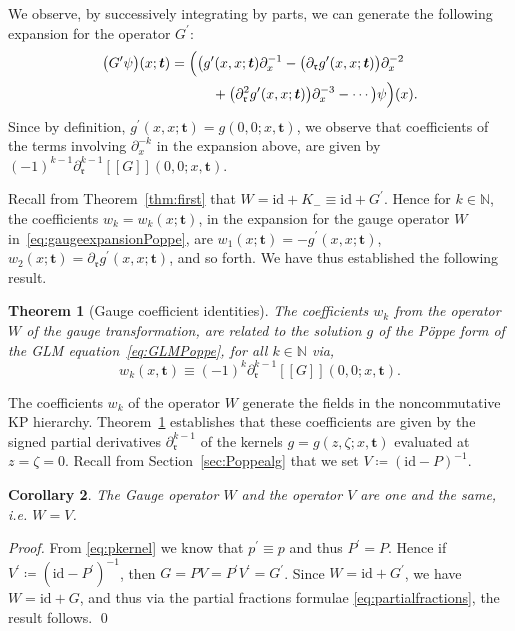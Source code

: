 \documentclass[5p,twocolumn]{elsarticle}
\newcommand*{\id}{{\mathrm{id}}}
\newcommand*{\pa}{{\partial}}
\newcommand*{\lb}{[\![}
\newcommand*{\rb}{]\!]}
\newcommand*{\tbf}{\boldsymbol{t}}
\newcommand*{\rl}{\mathfrak r}
\newtheorem{theorem}{Theorem}
\newtheorem{corollary}[theorem]{Corollary}
\begin{document}
We observe, by successively integrating by parts, we can generate the following expansion for the operator $G^\prime$:
\begin{align*}
  \bigl(G^\prime\psi\bigr)(x;\tbf)=&\;\Bigl(\bigl(g^\prime(x,x;\tbf)\pa_x^{-1}-\bigl(\pa_{\rl}g^\prime(x,x;\tbf)\bigr)\pa_x^{-2}\\
  &\;~~~~~+\bigl(\pa_{\rl}^2g^\prime(x,x;\tbf)\bigr)\pa_x^{-3}-\cdots\bigr)\psi\Bigr)(x).
\end{align*}
Since by definition, $g^\prime(x,x;\tbf)=g(0,0;x,\tbf)$, we observe that coefficients of the terms involving $\pa_x^{-k}$ in the expansion above,  
are given by $(-1)^{k-1}\pa^{k-1}_{\rl}\lb G\rb(0,0;x,\tbf)$.

Recall from Theorem~\ref{thm:first} that $W=\id+K_-\equiv\id+G^\prime$.
Hence for $k\in\mathbb N$, the coefficients $w_k=w_k(x;\tbf)$, in the expansion for the gauge operator $W$ in~\eqref{eq:gaugeexpansionPoppe},
are $w_1(x;\tbf)=-g^\prime(x,x;\tbf)$, $w_2(x;\tbf)=\pa_{\rl}g^\prime(x,x;\tbf)$, and so forth.
We have thus established the following result.
%
\begin{theorem}[Gauge coefficient identities]\label{thm:gaugecoeffsid}
  The coefficients $w_k$ from the operator $W$ of the gauge transformation, are related to the solution $g$ of the P\"oppe form of the GLM equation~\eqref{eq:GLMPoppe}, for all $k\in\mathbb N$ via,
  \begin{equation}\label{eq:solutionansatz}
    w_k(x,\tbf)\equiv(-1)^{k}\pa^{k-1}_{\rl}\lb G\rb(0,0;x,\tbf).
  \end{equation}
\end{theorem}
%
The coefficients $w_k$ of the operator $W$ generate the fields in the noncommutative KP hierarchy.
Theorem~\ref{thm:gaugecoeffsid} establishes that these coefficients are given by the signed partial derivatives $\pa_{\rl}^{k-1}$ of the kernels $g=g(z,\zeta;x,\tbf)$ evaluated at $z=\zeta=0$.
Recall from Section~\ref{sec:Poppealg} that we set $V\coloneqq(\id-P)^{-1}$.
%
\begin{corollary}\label{cor:WequalsV}
  The Gauge operator $W$ and the operator $V$ are one and the same, i.e.\/ $W=V$.
\end{corollary}
%
\begin{proof}
From \eqref{eq:pkernel} we know that $p^\prime\equiv p$ and thus $P^\prime=P$. Hence if $V^\prime\coloneqq(\id-P^\prime)^{-1}$, then $G=PV=P^\prime V^\prime=G^\prime$.
Since $W=\id+G^\prime$, we have $W=\id+G$, and thus via the partial fractions formulae \eqref{eq:partialfractions}, the result follows.
\qed
\end{proof}
\end{document}
